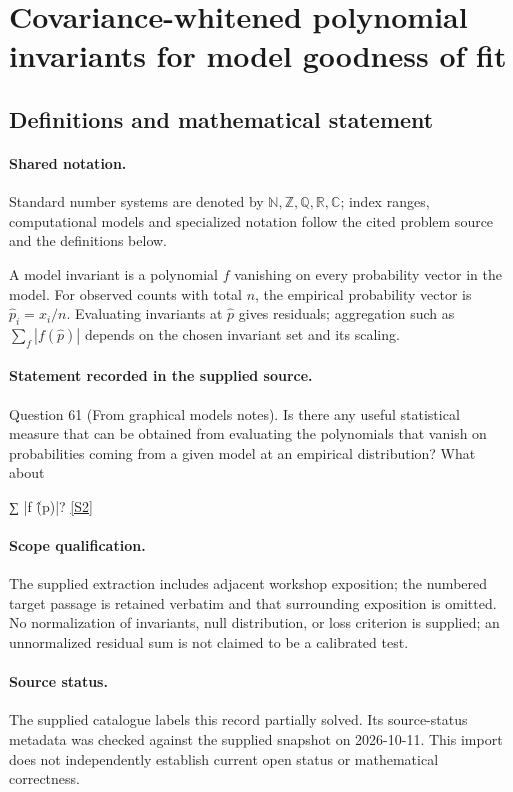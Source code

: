 \documentclass[11pt]{article}
\newcommand{\sref}[2]{\hyperlink{source:#1:#2}{[S#2]}}
\begin{document}
\section{Covariance-whitened polynomial invariants for model goodness of fit}\label{statement}

\subsection{Definitions and mathematical statement}

\paragraph{Shared notation.}Standard number systems are denoted by $\mathbb N,\mathbb Z,\mathbb Q,\mathbb R,\mathbb C$; index ranges, computational models and specialized notation follow the cited problem source and the definitions below.


A model invariant is a polynomial $f$ vanishing on every probability vector in the model. For observed counts with total $n$, the empirical probability vector is $\widehat p_i=x_i/n$. Evaluating invariants at $\widehat p$ gives residuals; aggregation such as $\sum_f|f(\widehat p)|$ depends on the chosen invariant set and its scaling.
\paragraph{Statement recorded in the supplied source.}
Question 61 (From graphical models notes). Is there any useful statistical measure that can be obtained from evaluating the polynomials that vanish on probabilities coming from a given model at an empirical distribution? What about

∑ |f (̂p)|? \sref{statement}{2}
\paragraph{Scope qualification.}
The supplied extraction includes adjacent workshop exposition; the numbered target passage is retained verbatim and that surrounding exposition is omitted. No normalization of invariants, null distribution, or loss criterion is supplied; an unnormalized residual sum is not claimed to be a calibrated test.
\paragraph{Source status.}
The supplied catalogue labels this record partially solved. Its source-status metadata was checked against the supplied snapshot on 2026-10-11. This import does not independently establish current open status or mathematical correctness.
\end{document}
